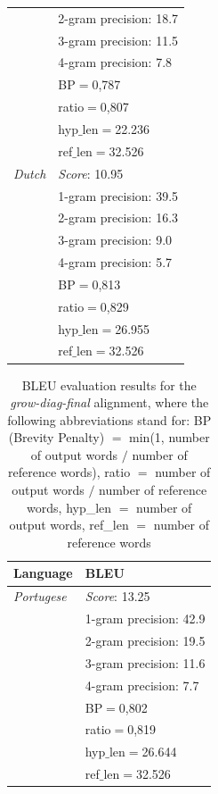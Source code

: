\documentclass[11pt]{article}
\begin{document}
\begin{itemize}
\begin{center}
\begin{tabular}{ | l | l |}
    & 2-gram precision: 18.7 \\
    & 3-gram precision: 11.5 \\
    & 4-gram precision: 7.8 \\
    & BP$=$0,787 \\
    & ratio$=$0,807 \\
    & hyp$\_$len$=$22.236 \\
    & ref$\_$len$=$32.526\\
    \hline
    \textit{Dutch} & \textit{Score}: 10.95 \\
    & 1-gram precision: 39.5 \\
    & 2-gram precision: 16.3 \\
    & 3-gram precision: 9.0 \\
    & 4-gram precision: 5.7 \\
    & BP$=$0,813 \\
    & ratio$=$0,829 \\
    & hyp$\_$len$=$26.955 \\
    & ref$\_$len$=$32.526\\
    \hline
    \end{tabular}
    
    \begin{table}
    \begin{tabular}{ | l | l |}
    \hline
    \textbf{Language} & \textbf{BLEU} \\ 
    \hline
    \textit{Portugese} & \textit{Score}: 13.25 \\
    & 1-gram precision: 42.9 \\
    & 2-gram precision: 19.5 \\
    & 3-gram precision: 11.6 \\
    & 4-gram precision: 7.7 \\
    & BP$=$0,802 \\
    & ratio$=$0,819 \\
    & hyp$\_$len$=$26.644 \\
    & ref$\_$len$=$32.526\\
    \hline
    \end{tabular}
    \caption{BLEU evaluation results for the \textit{grow-diag-final} alignment, where the following abbreviations stand for: BP (Brevity Penalty) $=$ min(1, number of output words $/$ number of reference words), ratio $=$ number of output words $/$ number of reference words, hyp\_len $=$ number of output words, ref\_len $=$ number of reference words }
    \label{bleuGrowDiagFinal}
    \end{table}
\end{center}


\end{itemize}
\end{document}
